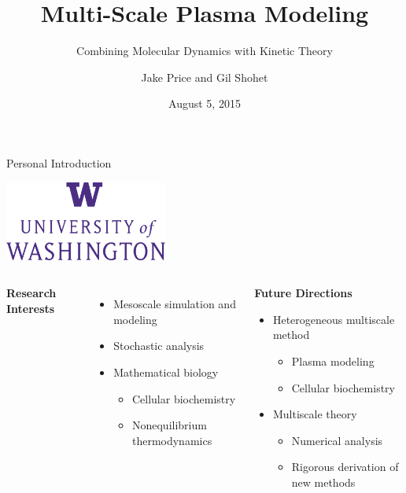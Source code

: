 \documentclass{beamer}
\title{Multi-Scale Plasma Modeling}
\subtitle{Combining Molecular Dynamics with Kinetic Theory}
\author[Price and Shohet]{Jake Price and Gil Shohet}
\institute[CPSSW]{Computational Physics Student Summer Workshop}
\date{August 5, 2015}
\begin{document}
	
	\begin{frame}
	\maketitle
	\end{frame}
	
	\begin{frame}[t]{Personal Introduction}
	\begin{center}\includegraphics[width=0.4\textwidth]{logo.png}\end{center}
	\vspace{-2em}
	\begin{columns}
	\column[t]{0.5\linewidth}
	\begin{center}\textbf{Research Interests}\end{center}
	\begin{itemize}
	\item Mesoscale simulation and modeling
	\item Stochastic analysis
	\item Mathematical biology
		\begin{itemize}
	\item Cellular biochemistry
	\item Nonequilibrium thermodynamics
	\end{itemize}
	\end{itemize}
	\column[t]{0.6\linewidth}
	\begin{center}
	\textbf{Future Directions}\vspace{0.575em}
	\begin{itemize}
	\item Heterogeneous multiscale method
	\begin{itemize}
	\item Plasma modeling
	\item Cellular biochemistry
	\end{itemize}
	\item Multiscale theory
	\begin{itemize}
	\item Numerical analysis
	\item Rigorous derivation of new methods
	\end{itemize}
	\end{itemize}
	\end{center}
	\end{columns}
		
	
	\end{frame}
	
\end{document}
